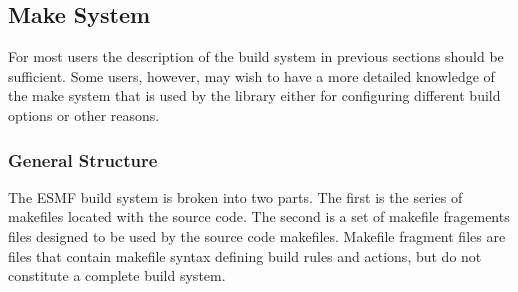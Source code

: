 

\subsection{Make System}
\label{sec:make}
For most users the description of the build system in previous
sections should be sufficient.  Some users, however, may wish to have a
more detailed knowledge of the make system that is used by the library
either for configuring different build options or other reasons.
\subsubsection{General Structure}

The ESMF build system is broken into two parts.  The first is the
series of makefiles located with the source code.  The second is a set
of makefile fragements files designed to be used by the source code
makefiles.  Makefile fragment files are files that contain makefile
syntax defining build rules and actions, but do not constitute a
complete build system.

